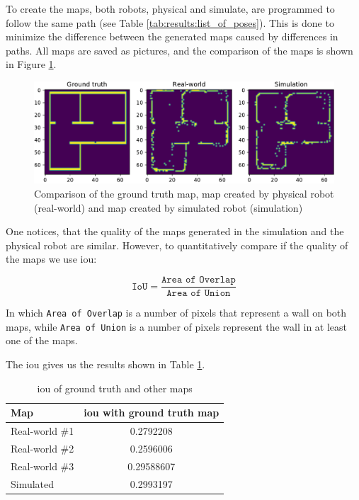 To create the maps, both robots, physical and simulate, are programmed to follow the same path (see Table \ref{tab:results:list_of_poses}).
This is done to minimize the difference between the generated maps caused by differences in paths.
All maps are saved as pictures, and the comparison of the maps is shown in Figure \ref{fig:results:map_comparison}.

\begin{figure}[H]
    \centering
    \includegraphics[width=\textwidth]{./results/figures/map_comparison.pdf}
    \caption{Comparison of the ground truth map, map created by physical robot (real-world) and map created by simulated robot (simulation)}
    \label{fig:results:map_comparison}
\end{figure}

One notices, that the quality of the maps generated in the simulation and the physical robot are similar.
However, to quantitatively compare if the quality of the maps we use \ac{iou}:

\begin{equation}
    \texttt{IoU} = \frac{\texttt{Area of Overlap}}{\texttt{Area of Union}}
\end{equation}

In which \texttt{Area of Overlap} is a number of pixels that represent a wall on both maps, while \texttt{Area of Union} is a number of pixels represent the wall in at least one of the maps.

The \ac{iou} gives us the results shown in Table \ref{tab:results:map_iou}.

\begin{table}[H]
    \centering
    \begin{tabular}{|l|c|}
        \hline
        \textbf{Map} & \textbf{\acs{iou} with ground truth map} \\
        \hline
        Real-world \#1 & 0.2792208 \\
        \hline
        Real-world \#2 & 0.2596006 \\
        \hline
        Real-world \#3 & 0.29588607 \\
        \hline
        Simulated & 0.2993197 \\
        \hline
    \end{tabular}
    \caption{\ac{iou} of ground truth and other maps}
    \label{tab:results:map_iou}
\end{table}

